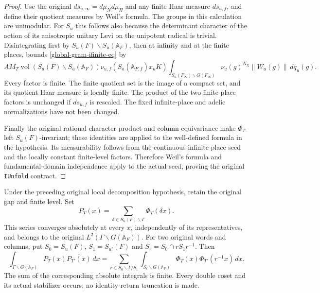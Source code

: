 \begin{proof}
Use the original $ds_{u,\infty}=d\mu_Nd\mu_H$ and any finite
Haar measure $ds_{u,f}$, and define their quotient measures by
Weil's formula.  The groups in this calculation are unimodular.
For $S_u$ this follows also because the determinant character of
the action of its anisotropic unitary Levi on the unipotent radical
is trivial.  Disintegrating first by $S_u(F)\backslash S_u(\mathbb A_F)$,
then at infinity and at the finite places, bounds
\eqref{global-gram-ifinite-eq} by
\[
 A M_T\operatorname{vol}(S_u(F)\backslash S_u(\mathbb A_F))
       \nu_{u,f}(S_u(\mathbb A_{F,f})x_uK)
       \int_{S_u(F_\infty)\backslash G(F_\infty)}
                \nu_u(g)^{N_X}\|W_u(g)\|\,dq_u(g).
\]
Every factor is finite.  The finite quotient set is the image of
a compact set, and its quotient Haar measure is locally finite.
The product of the two finite-place factors is unchanged if
$ds_{u,f}$ is rescaled.  The fixed infinite-place and adelic
normalizations have not been changed.

Finally the original rational character product and column
equivariance make $\Phi_T$ left $S_u(F)$-invariant; these identities
are applied to the well-defined formula in the hypothesis.
Its measurability follows from the continuous infinite-place seed
and the locally constant finite-level factors.  Therefore Weil's
formula and fundamental-domain independence apply to the actual
seed, proving the original \texttt{IUnfold} contract.
\end{proof}

\begin{corollary}
\label{global-gram-poincare}
Under the preceding original local decomposition hypothesis, retain
the original gap and finite level.  Set
\[
 P_T(x)=\sum_{\delta\in S_u(F)\backslash\Gamma}\Phi_T(\delta x).
\]
This series converges absolutely at every $x$, independently of its
representatives, and belongs to the original $L^2(\Gamma\backslash G(\mathbb A_F))$.
For two original words and columns, put
$S_0=S_u(F)$, $S_1=S_{u'}(F)$ and
$S_r=S_0\cap rS_1r^{-1}$.  Then
\begin{equation}\label{global-gram-unfolding}
 \int_{\Gamma\backslash G(\mathbb A_F)}P_T(x)\overline{P_{T'}(x)}\,dx
 =\sum_{r\in S_0\backslash\Gamma/S_1}
       \int_{S_r\backslash G(\mathbb A_F)}
          \Phi_T(x)\overline{\Phi_{T'}(r^{-1}x)}\,dx .
\end{equation}
The sum of the corresponding absolute integrals is finite.  Every
double coset and its actual stabilizer occurs; no identity-return
truncation is made.
\end{corollary}

